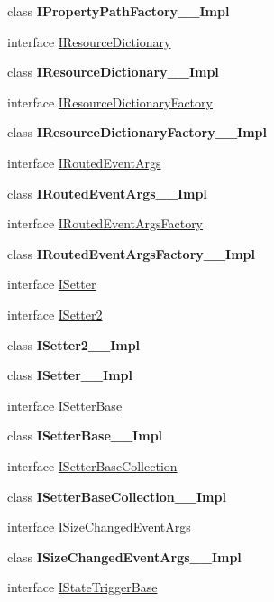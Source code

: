 \begin{DoxyCompactItemize}
\item 
class {\bfseries I\+Property\+Path\+Factory\+\_\+\+\_\+\+Impl}
\item 
interface \hyperlink{interface_windows_1_1_u_i_1_1_xaml_1_1_i_resource_dictionary}{I\+Resource\+Dictionary}
\item 
class {\bfseries I\+Resource\+Dictionary\+\_\+\+\_\+\+Impl}
\item 
interface \hyperlink{interface_windows_1_1_u_i_1_1_xaml_1_1_i_resource_dictionary_factory}{I\+Resource\+Dictionary\+Factory}
\item 
class {\bfseries I\+Resource\+Dictionary\+Factory\+\_\+\+\_\+\+Impl}
\item 
interface \hyperlink{interface_windows_1_1_u_i_1_1_xaml_1_1_i_routed_event_args}{I\+Routed\+Event\+Args}
\item 
class {\bfseries I\+Routed\+Event\+Args\+\_\+\+\_\+\+Impl}
\item 
interface \hyperlink{interface_windows_1_1_u_i_1_1_xaml_1_1_i_routed_event_args_factory}{I\+Routed\+Event\+Args\+Factory}
\item 
class {\bfseries I\+Routed\+Event\+Args\+Factory\+\_\+\+\_\+\+Impl}
\item 
interface \hyperlink{interface_windows_1_1_u_i_1_1_xaml_1_1_i_setter}{I\+Setter}
\item 
interface \hyperlink{interface_windows_1_1_u_i_1_1_xaml_1_1_i_setter2}{I\+Setter2}
\item 
class {\bfseries I\+Setter2\+\_\+\+\_\+\+Impl}
\item 
class {\bfseries I\+Setter\+\_\+\+\_\+\+Impl}
\item 
interface \hyperlink{interface_windows_1_1_u_i_1_1_xaml_1_1_i_setter_base}{I\+Setter\+Base}
\item 
class {\bfseries I\+Setter\+Base\+\_\+\+\_\+\+Impl}
\item 
interface \hyperlink{interface_windows_1_1_u_i_1_1_xaml_1_1_i_setter_base_collection}{I\+Setter\+Base\+Collection}
\item 
class {\bfseries I\+Setter\+Base\+Collection\+\_\+\+\_\+\+Impl}
\item 
interface \hyperlink{interface_windows_1_1_u_i_1_1_xaml_1_1_i_size_changed_event_args}{I\+Size\+Changed\+Event\+Args}
\item 
class {\bfseries I\+Size\+Changed\+Event\+Args\+\_\+\+\_\+\+Impl}
\item 
interface \hyperlink{interface_windows_1_1_u_i_1_1_xaml_1_1_i_state_trigger_base}{I\+State\+Trigger\+Base}
\item 

\end{DoxyCompactItemize}
